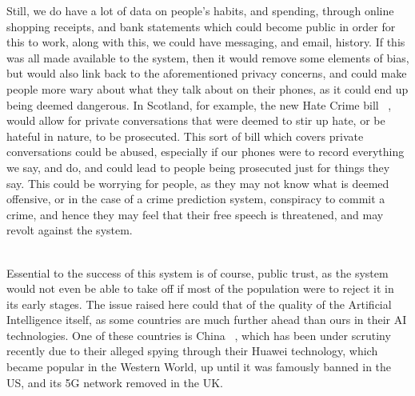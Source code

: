 Still, we do have a lot of data on people's habits, and spending, through online shopping receipts, and bank statements
which could become public in order for this to work, along with this, we could have messaging, and email, history.
If this was all made available to the system, then it would remove some elements of bias, but would also link back to
the aforementioned privacy concerns, and could make people more wary about what they talk about on their phones, as
it could end up being deemed dangerous.
In Scotland, for example, the new Hate Crime bill  ~\cite{hate-crime-bill}, would allow for private conversations that
were deemed to stir up hate, or be hateful in nature, to be prosecuted.
This sort of bill which covers private conversations could be abused, especially if our phones were to record
everything we say, and do, and could lead to people being prosecuted just for things they say.
This could be worrying for people, as they may not know what is deemed offensive, or in the case of a crime prediction
system, conspiracy to commit a crime, and hence they may feel that their free speech is threatened, and may revolt
against the system.


%
%
%

\\

Essential to the success of this system is of course, public trust, as the system would not even be able to take off
if most of the population were to reject it in its early stages.
The issue raised here could that of the quality of the Artificial Intelligence itself, as some countries are much
further ahead than ours in their AI technologies.
One of these countries is China ~\cite{ai-arms-race}, which has been under scrutiny recently due to their alleged
spying through their Huawei technology, which became popular in the Western World, up until it was famously banned in
the US\cite{huawei-ban-us}, and its 5G network removed in the UK\cite{huawei-ban-uk}.

